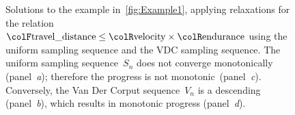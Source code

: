 \begin{figure}[h]
    \centering

    \centering

    \caption{
        Solutions to the example in~\cref{fig:Example1}, applying relaxations for the relation ${\colF\text{travel\_distance}}\leq{\colR\text{velocity}}\times{\colR\text{endurance}}$ using the uniform sampling sequence and the VDC sampling sequence.
        The uniform sampling sequence~$S_{n}$ does not converge monotonically (panel~\emph{a}); therefore the progress is not monotonic~(panel\emph{~c}).
        Conversely, the Van Der Corput sequence~$V_{n}$ is a descending  (panel~\emph{b}), which results in monotonic progress (panel~\emph{d}).
    }
\end{figure}

%
%
%
%

